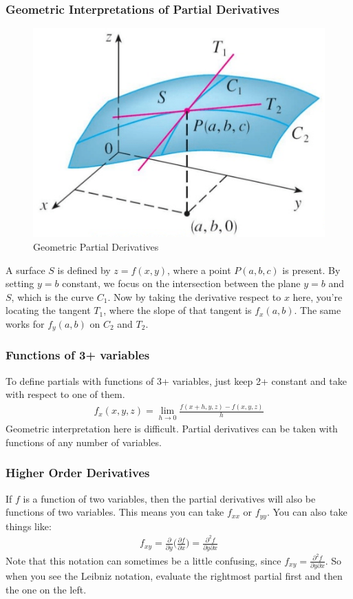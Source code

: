 \documentclass{article}
\newcommand{\p}{\partial}
\begin{document}
\subsubsection{Geometric Interpretations of Partial Derivatives}
\begin{figure}[H]
\begin{center}
\includegraphics[scale=0.4]{PartialInterpretations.png}
\caption{Geometric Partial Derivatives}
\label{partderiv}
\end{center}
\end{figure}
A surface $S$ is defined by $z = f(x,y)$, where a point $P(a,b,c)$ is present. By setting $y = b$ constant, we focus on the intersection between the plane $y = b$ and $S$, which is the curve $C_1$. Now by taking the derivative respect to $x$ here, you're locating the tangent $T_1$, where the slope of that tangent is $f_x(a,b)$. The same works for $f_y(a,b)$ on $C_2$ and $T_2$.
\subsubsection{Functions of 3+ variables}
To define partials with functions of 3+ variables, just keep 2+ constant and take with respect to one of them.
\begin{gather*}
    f_x(x,y,z) = \lim_{h \to 0} \frac{f(x+h,y,z) - f(x,y,z)}{h}
\end{gather*}
Geometric interpretation here is difficult. Partial derivatives can be taken with functions of any number of variables.
\subsubsection{Higher Order Derivatives}
If $f$ is a function of two variables, then the partial derivatives will also be functions of two variables. This means you can take $f_{xx}$ or $f_{yy}$. You can also take things like:
\begin{gather*}
    f_{xy} = \frac{\p}{\p y}\bigg(\frac{\p f}{\p x}\bigg) = \frac{\p^2f}{\p y \p x}
\end{gather*}
Note that this notation can sometimes be a little confusing, since $f_{xy} = \frac{\p^2f}{\p y \p x}$. So when you see the Leibniz notation, evaluate the rightmost partial first and then the one on the left.
\end{document}
